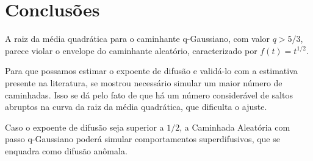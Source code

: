 
\section{Conclusões}

A raiz da média quadrática para o caminhante q-Gaussiano, com valor $q > 5/3$,
parece violar o envelope do caminhante aleatório, caracterizado por
$f(t) = t^{1/2}$.

\vspace{5mm}
Para que possamos estimar o expoente de difusão e validá-lo com a estimativa
presente na literatura, se mostrou necessário simular um maior número de
caminhadas. Isso se dá pelo fato de que há um número considerável de saltos
abruptos na curva da raiz da média quadrática, que dificulta o ajuste.

\vspace{5mm}
Caso o expoente de difusão seja superior a $1/2$, a Caminhada Aleatória com
passo q-Gaussiano poderá simular comportamentos superdifusivos, que se enquadra
como difusão anômala.
